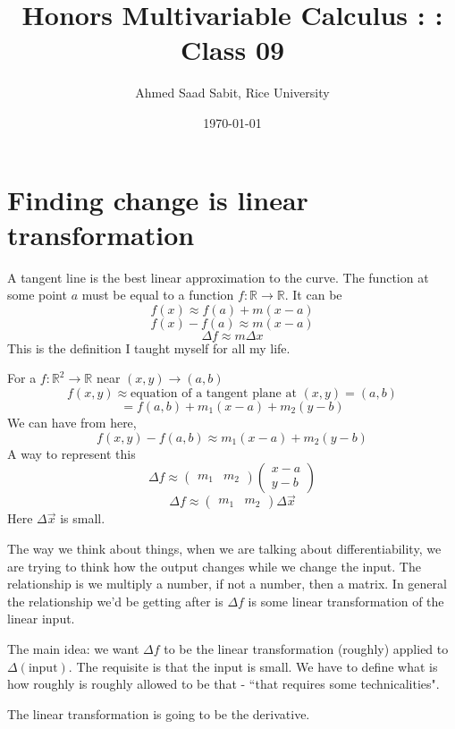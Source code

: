 \documentclass[letter]{article}
\title{Honors Multivariable Calculus : : Class 09}
\author{Ahmed Saad Sabit, Rice University}
\date{\today}
\begin{document}
\maketitle
\section{Finding change is linear transformation} 

A tangent line is the best linear approximation to the curve. The function at some point $a$ must be equal to a function $f: \mathbb{R}\to \mathbb{R}$. It can be 
\[
f(x) \approx f(a) + m (x-a)	
\] 
\[
f(x) - f(a) \approx m (x-a)
\] 
\[
\Delta f \approx m \Delta x
\] 
This is the definition I taught myself for all my life. 

For a $f: \mathbb{R}^{2} \to  \mathbb{R}$ near $(x,y) \to (a,b)$
\[
f(x,y) \approx \text{equation of a tangent plane at } (x,y)  = (a,b)
\]
\[
= f(a,b) + m_1 (x-a) + m_2(y -b)
\]
We can have from here, 
\[
f(x,y) - f(a,b) \approx m_1 (x - a) + m_2 (y-b)
\] 
A way to represent this 
\[
	\Delta f \approx \begin{pmatrix} m_1 & m_2 \end{pmatrix}  
	\begin{pmatrix} x-a \\ y-b \end{pmatrix} 
\]
\[
	\Delta f \approx \begin{pmatrix} m_1 & m_2 \end{pmatrix}  \Delta \vec{x}
\]
Here $\Delta \vec{x}$ is small. 

The way we think about things, when we are talking about differentiability, we are trying to think how the output changes while we change the input. The relationship is we multiply a number, if not a number, then a matrix. In general the relationship we'd be getting after is $\Delta f$ is some linear transformation of the linear input. 

The main idea: we want $\Delta f$ to be the linear transformation (roughly) applied to $\Delta (\text{input})$. The requisite is that the input is small. We have to define what is how roughly is roughly allowed to be that - ``that requires some technicalities".  

The linear transformation is going to be the derivative. 
\end{document}
